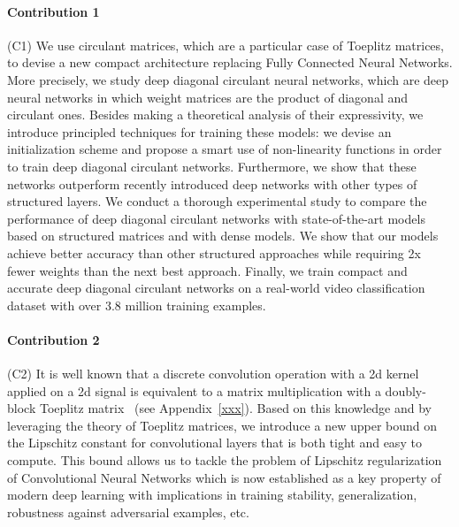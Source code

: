 \paragraph{Contribution 1} (C1)
We use circulant matrices, which are a particular case of Toeplitz matrices, to devise a new compact architecture replacing Fully Connected Neural Networks.
More precisely, we study deep diagonal circulant neural networks, which are deep neural networks in which weight matrices are the product of diagonal and circulant ones.
Besides making a theoretical analysis of their expressivity, we introduce principled techniques for training these models: we devise an initialization scheme and propose a smart use of non-linearity functions in order to train deep diagonal circulant networks. 
Furthermore, we show that these networks outperform recently introduced deep networks with other types of structured layers.
We conduct a thorough experimental study to compare the performance of deep diagonal circulant networks with state-of-the-art models based on structured matrices and with dense models.
We show that our models achieve better accuracy than other structured approaches while requiring 2x fewer weights than the next best approach.
Finally, we train compact and accurate deep diagonal circulant networks on a real-world video classification dataset with over 3.8 million training examples. 

\paragraph{Contribution 2} (C2)
It is well known that a discrete convolution operation with a 2d kernel applied on a 2d signal is equivalent to a matrix multiplication with a doubly-block Toeplitz matrix~\cite{jain1989fundamentals} (see Appendix~\ref{xxx}). 
Based on this knowledge and by leveraging the theory of Toeplitz matrices, we introduce a new upper bound on the Lipschitz constant for convolutional layers that is both tight and easy to compute.
This bound allows us to tackle the problem of Lipschitz regularization of Convolutional Neural Networks which is now established as a key property of modern deep learning with implications in training stability, generalization, robustness against adversarial examples, etc.

%
%
%


